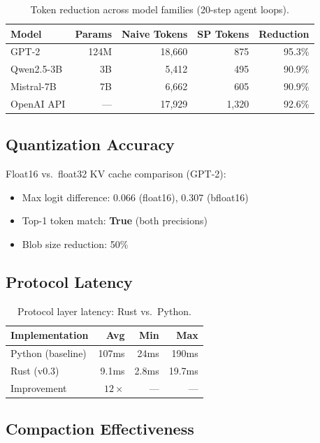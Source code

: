 \documentclass[11pt,a4paper]{article}
\begin{document}
\begin{table}[h]
\centering
\caption{Token reduction across model families (20-step agent loops).}
\label{tab:tokens}
\begin{tabular}{lrrrr}
\toprule
Model & Params & Naive Tokens & SP Tokens & Reduction \\
\midrule
GPT-2            & 124M & 18,660 & 875   & 95.3\% \\
Qwen2.5-3B       & 3B   & 5,412  & 495   & 90.9\% \\
Mistral-7B       & 7B   & 6,662  & 605   & 90.9\% \\
OpenAI API       & ---  & 17,929 & 1,320 & 92.6\% \\
\bottomrule
\end{tabular}
\end{table}

\subsection{Quantization Accuracy}

Float16 vs.\ float32 KV cache comparison (GPT-2):
\begin{itemize}
  \item Max logit difference: 0.066 (float16), 0.307 (bfloat16)
  \item Top-1 token match: \textbf{True} (both precisions)
  \item Blob size reduction: 50\%
\end{itemize}

\subsection{Protocol Latency}

\begin{table}[h]
\centering
\caption{Protocol layer latency: Rust vs.\ Python.}
\label{tab:latency}
\begin{tabular}{lrrr}
\toprule
Implementation & Avg & Min & Max \\
\midrule
Python (baseline) & 107ms & 24ms & 190ms \\
Rust (v0.3)       & 9.1ms & 2.8ms & 19.7ms \\
\midrule
Improvement & $12\times$ & --- & --- \\
\bottomrule
\end{tabular}
\end{table}

\subsection{Compaction Effectiveness}
\end{document}
